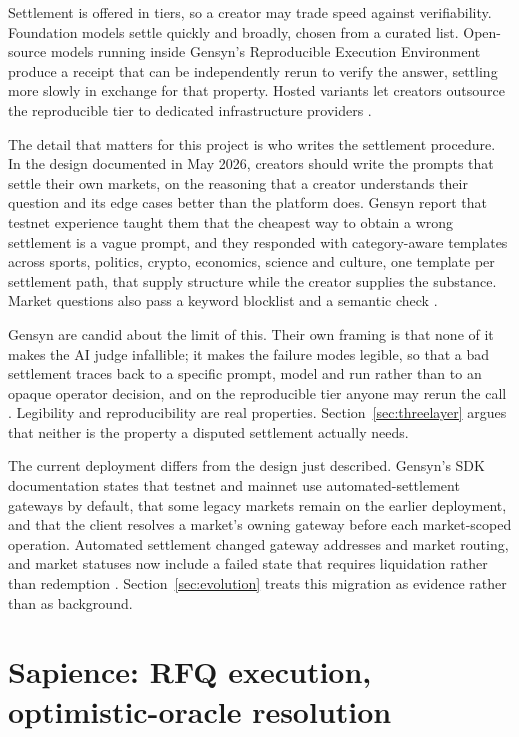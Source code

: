 Settlement is offered in tiers, so a creator may trade speed against verifiability.
Foundation models settle quickly and broadly, chosen from a curated list. Open-source models
running inside Gensyn's Reproducible Execution Environment produce a receipt that can be
independently rerun to verify the answer, settling more slowly in exchange for that
property. Hosted variants let creators outsource the reproducible tier to dedicated
infrastructure providers \cite{gensyn2026delphi}.

The detail that matters for this project is who writes the settlement procedure. In the
design documented in May 2026, creators should write the prompts that settle their own
markets, on the reasoning that a creator understands their question and its edge cases
better than the platform does. Gensyn report
that testnet experience taught them that the cheapest way to obtain a wrong settlement is a
vague prompt, and they responded with category-aware templates across sports, politics,
crypto, economics, science and culture, one template per settlement path, that supply
structure while the creator supplies the substance. Market questions also pass a keyword
blocklist and a semantic check \cite{gensyn2026delphi}.

Gensyn are candid about the limit of this. Their own framing is that none of it makes the
AI judge infallible; it makes the failure modes legible, so that a bad settlement traces
back to a specific prompt, model and run rather than to an opaque operator decision, and on
the reproducible tier anyone may rerun the call \cite{gensyn2026delphi}. Legibility and
reproducibility are real properties. Section~\ref{sec:threelayer} argues that neither is
the property a disputed settlement actually needs.

The current deployment differs from the design just described. Gensyn's SDK documentation
states that testnet and mainnet use automated-settlement gateways by default, that some
legacy markets remain on the earlier deployment, and that the client resolves a market's
owning gateway before each market-scoped operation. Automated settlement changed gateway
addresses and market routing, and market statuses now include a failed state that requires
liquidation rather than redemption \cite{gensyn2026sdk}. Section~\ref{sec:evolution} treats
this migration as evidence rather than as background.

\section{Sapience: RFQ execution, optimistic-oracle resolution}
\label{sec:sapience}

